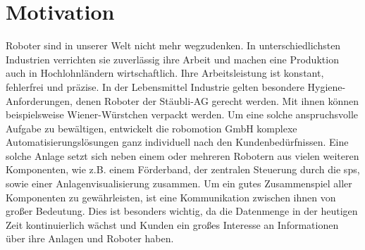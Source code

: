 \documentclass[ a4paper,
                oneside,
                toc=bibliography,
                toc=listof
                ]{scrbook}
\begin{document}
    \section{Motivation}
    Roboter sind in unserer Welt nicht mehr wegzudenken. In unterschiedlichsten Industrien verrichten sie zuverlässig ihre Arbeit und machen eine Produktion auch in Hochlohnländern wirtschaftlich. Ihre Arbeitsleistung ist konstant, fehlerfrei und präzise. In der Lebensmittel Industrie gelten besondere Hygiene-Anforderungen, denen Roboter der \glqq Stäubli-AG\grqq{} gerecht werden. Mit ihnen können beispielsweise Wiener-Würstchen verpackt werden. Um eine solche anspruchsvolle Aufgabe zu bewältigen, entwickelt die \glqq robomotion GmbH\grqq{} komplexe Automatisierungslösungen ganz individuell nach den Kundenbedürfnissen. Eine solche Anlage setzt sich neben einem oder mehreren Robotern aus vielen weiteren Komponenten, wie z.B. einem Förderband, der zentralen Steuerung durch die \ac{sps}, sowie einer Anlagenvisualisierung zusammen. Um ein gutes Zusammenspiel aller Komponenten zu gewährleisten, ist eine Kommunikation zwischen ihnen von großer Bedeutung. Dies ist besonders wichtig, da die Datenmenge in der heutigen Zeit kontinuierlich wächst und Kunden ein großes Interesse an Informationen über ihre Anlagen und Roboter haben.
\end{document}
